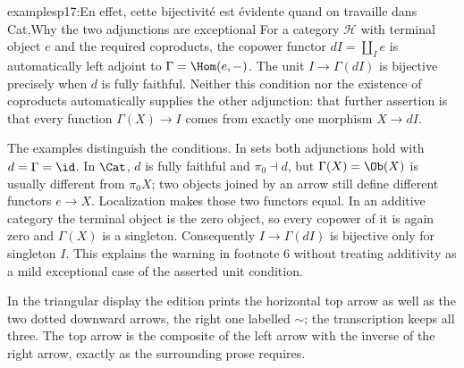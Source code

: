\begin{dcomment}{examples}{p17:En effet, cette bijectivité est évidente quand on travaille dans Cat,}{Why the two adjunctions are exceptional}
For a category $\mathcal H$ with terminal object $e$ and the required coproducts, the copower functor $dI=\coprod_I e$ is automatically left adjoint to $\Gamma=\Hom(e,-)$. The unit $I\to\Gamma(dI)$ is bijective precisely when $d$ is fully faithful. Neither this condition nor the existence of coproducts automatically supplies the other adjunction: that further assertion is that every function $\Gamma(X)\to I$ comes from exactly one morphism $X\to dI$.

The examples distinguish the conditions. In sets both adjunctions hold with $d=\Gamma=\id$. In $\Cat$, $d$ is fully faithful and $\pi_0\dashv d$, but $\Gamma(X)=\Ob(X)$ is usually different from $\pi_0X$; two objects joined by an arrow still define different functors $e\to X$. Localization makes those two functors equal. In an additive category the terminal object is the zero object, so every copower of it is again zero and $\Gamma(X)$ is a singleton. Consequently $I\to\Gamma(dI)$ is bijective only for singleton $I$. This explains the warning in footnote 6 without treating additivity as a mild exceptional case of the asserted unit condition.

In the triangular display the edition prints the horizontal top arrow as well as the two dotted downward arrows, the right one labelled $\sim$; the transcription keeps all three. The top arrow is the composite of the left arrow with the inverse of the right arrow, exactly as the surrounding prose requires.
\end{dcomment}

